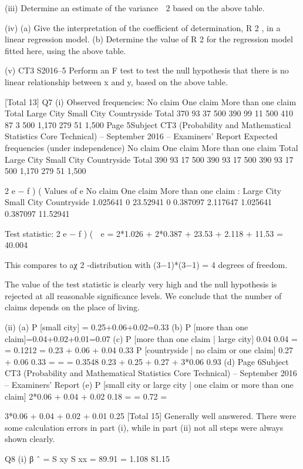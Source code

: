 \documentclass[a4paper,12pt]{article}
\begin{document}
\begin{enumerate}
(iii) Determine an estimate of the variance  2 based on the above table.

(iv) (a) Give the interpretation of the coefficient of determination, R 2 , in a
linear regression model.
(b) Determine the value of R 2 for the regression model fitted here, using
the above table.

(v)
CT3 S2016–5
Perform an F test to test the null hypothesis that there is no linear relationship
between x and y, based on the above table.

[Total 13]
Q7
(i)
Observed frequencies:
No claim
One claim
More than one claim
Total
Large City Small City Countryside Total
370
93
37
500 390
99
11
500 410
87
3
500 1,170
279
51
1,500
Page 5Subject CT3 (Probability and Mathematical Statistics Core Technical) – September 2016 – Examiners’ Report
Expected frequencies (under independence)
No claim
One claim
More than one claim
Total
Large City Small City Countryside Total
390
93
17
500 390
93
17
500 390
93
17
500 1,170
279
51
1,500

2
e − f )
(
Values of
e
No claim
One claim
More than one claim
:
Large City Small City Countryside
1.025641
0
23.52941 0
0.387097
2.117647 1.025641
0.387097
11.52941

Test statistic:
2
e − f )
(

e
= 2*1.026 + 2*0.387 + 23.53 + 2.118 + 11.53 = 40.004

This compares to aχ 2 -distribution with (3−1)*(3−1) = 4 degrees of freedom.

The value of the test statistic is clearly very high and the null hypothesis is
rejected at all reasonable significance levels. We conclude that the number of
claims depends on the place of living.

(ii)
(a) P [small city] = 0.25+0.06+0.02=0.33 
(b) P [more than one claim]=0.04+0.02+0.01=0.07 
(c) P [more than one claim | large city]
0.04
0.04
=
= 0.1212
=
0.23 + 0.06 + 0.04 0.33 
P [countryside | no claim or one claim]
0.27 + 0.06
0.33
=
=
= 0.3548
0.23 + 0.25 + 0.27 + 3*0.06 0.93 
(d)
Page 6Subject CT3 (Probability and Mathematical Statistics Core Technical) – September 2016 – Examiners’ Report
(e)
P [small city or large city | one claim or more than one claim]
2*0.06 + 0.04 + 0.02
0.18
=
= 0.72
=

3*0.06 + 0.04 + 0.02 + 0.01 0.25
[Total 15]
Generally well answered. There were some calculation errors in part (i), while
in part (ii) not all steps were always shown clearly.

Q8
(i)
β ˆ =
S xy
S xx
=
89.91
= 1.108
81.15


\end{enumerate}
\end{document}
